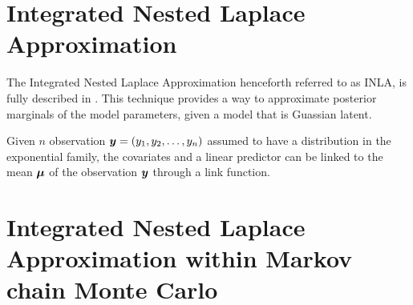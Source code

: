 \chapter{Integrated Nested Laplace Approximation}
\label{chap:inla}

The Integrated Nested Laplace Approximation henceforth referred to as INLA, is fully described in \cite{rue_approximate_2009}.
This technique provides a way to approximate posterior marginals of the model parameters, given a model that is
Guassian latent. 


Given $n$ observation $\bm{y} = (y_1,y_2,\dots,y_n)$ assumed to have a distribution in the exponential family, 
the covariates and a linear predictor can be linked to the mean $\bm{\mu}$ of the observation $\bm{y}$
through a link function. 


\chapter{Integrated Nested Laplace Approximation within Markov chain Monte Carlo}
\label{chap:inlawmcmc}
